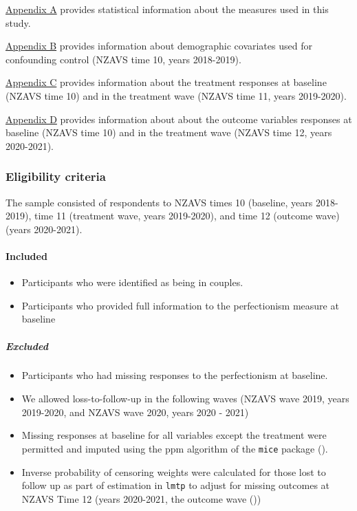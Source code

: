 \documentclass[
  singlecolumn]{article}
\let\oldparagraph\paragraph
\renewcommand{\paragraph}[1]{\oldparagraph{#1}\mbox{}}
\let\oldsubparagraph\subparagraph
\renewcommand{\subparagraph}[1]{\oldsubparagraph{#1}\mbox{}}
\providecommand{\tightlist}{%
  \setlength{\itemsep}{0pt}\setlength{\parskip}{0pt}}\usepackage{longtable,booktabs,array}
\begin{document}
\hyperref[appendix-measures]{Appendix A} provides statistical
information about the measures used in this study.

\hyperref[appendix-demographics]{Appendix B} provides information about
demographic covariates used for confounding control (NZAVS time 10,
years 2018-2019).

\hyperref[appendix-exposures]{Appendix C} provides information about the
treatment responses at baseline (NZAVS time 10) and in the treatment
wave (NZAVS time 11, years 2019-2020).

\hyperref[appendix-outcomes]{Appendix D} provides information about
about the outcome variables responses at baseline (NZAVS time 10) and in
the treatment wave (NZAVS time 12, years 2020-2021).

\subsubsection{Eligibility criteria}\label{eligibility-criteria}

The sample consisted of respondents to NZAVS times 10 (baseline, years
2018-2019), time 11 (treatment wave, years 2019-2020), and time 12
(outcome wave) (years 2020-2021).

\paragraph{Included}\label{included}

\begin{itemize}
\tightlist
\item
  Participants who were identified as being in couples.\\
\item
  Participants who provided full information to the perfectionism
  measure at baseline
\end{itemize}

\subparagraph{Excluded}\label{excluded}

\begin{itemize}
\tightlist
\item
  Participants who had missing responses to the perfectionism at
  baseline.
\item
  We allowed loss-to-follow-up in the following waves (NZAVS wave 2019,
  years 2019-2020, and NZAVS wave 2020, years 2020 - 2021)
\item
  Missing responses at baseline for all variables except the treatment
  were permitted and imputed using the ppm algorithm of the
  \texttt{mice} package ().
\item
  Inverse probability of censoring weights were calculated for those
  lost to follow up as part of estimation in \texttt{lmtp} to adjust for
  missing outcomes at NZAVS Time 12 (years 2020-2021, the outcome wave
  ())
\end{itemize}
\end{document}
